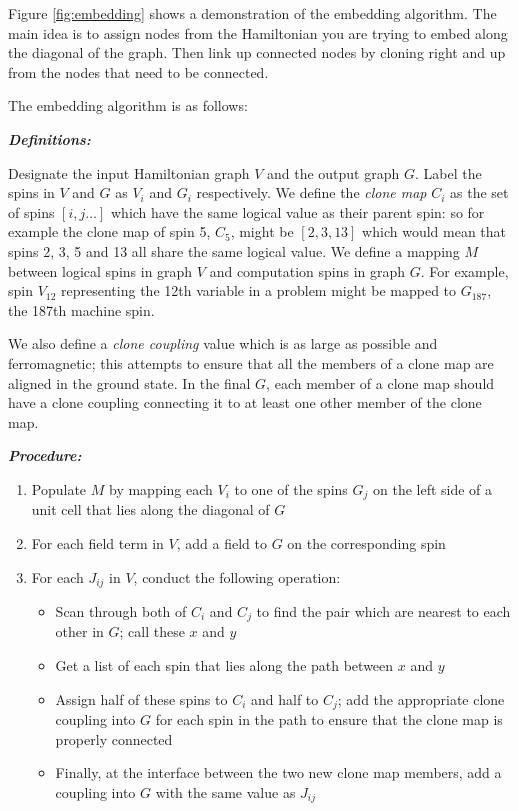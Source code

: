 Figure \ref{fig:embedding} shows a demonstration of the embedding algorithm.  The main idea is to assign nodes from the Hamiltonian you are trying to embed along the diagonal of the \machine graph.  Then link up connected nodes by cloning right and up from the nodes that need to be connected.

The embedding algorithm is as follows:

\emph{\textbf{Definitions:}}

Designate the input Hamiltonian graph $V$ and the output graph $G$.  Label the spins in $V$ and $G$ as $V_i$ and $G_i$ respectively.
We define the \emph{clone map} $C_i$ as the set of spins $[i,j \ldots]$ which have the same logical value as their parent spin: so for example the clone map of spin 5, $C_5$, might be $[2,3,13]$ which would mean that spins 2, 3, 5 and 13 all share the same logical value.  
We define a mapping $M$ between logical spins in graph $V$ and computation spins in graph $G$.  For example, spin $V_{12}$ representing the 12th variable in a problem might be mapped to $G_{187}$, the 187th machine spin.

We also define a \emph{clone coupling} value which is as large as possible and ferromagnetic; this attempts to ensure that all the members of a clone map are aligned in the ground state.  In the final $G$, each member of a clone map should have a clone coupling connecting it to at least one other member of the clone map.

\emph{\textbf{Procedure:}}
\begin{enumerate}
	\item Populate $M$ by mapping each $V_i$ to one of the spins $G_j$ on the left side of a unit cell that lies along the diagonal of $G$
	\item For each field term in $V$, add a field to $G$ on the corresponding spin
	\item For each $J_{ij}$ in $V$, conduct the following operation:
		\begin{itemize}
			\item Scan through both of $C_i$ and $C_j$ to find the pair which are nearest to each other in $G$; call these $x$ and $y$
			\item Get a list of each spin that lies along the path between $x$ and $y$
			\item Assign half of these spins to $C_i$ and half to $C_j$; add the appropriate clone coupling into $G$ for each spin in the path to ensure that the clone map is properly connected
			\item Finally, at the interface between the two new clone map members, add a coupling into $G$ with the same value as $J_{ij}$
		\end{itemize}
\end{enumerate}


